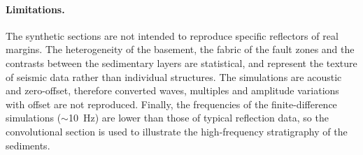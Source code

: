 \paragraph{Limitations.}
The synthetic sections are not intended to reproduce specific reflectors of real margins. The
heterogeneity of the basement, the fabric of the fault zones and the contrasts between the
sedimentary layers are statistical, and represent the texture of seismic data rather than
individual structures. The simulations are acoustic and zero-offset, therefore converted
waves, multiples and amplitude variations with offset are not reproduced. Finally, the
frequencies of the finite-difference simulations ($\sim$10~Hz) are lower than those of
typical reflection data, so the convolutional section is used to illustrate the
high-frequency stratigraphy of the sediments.
